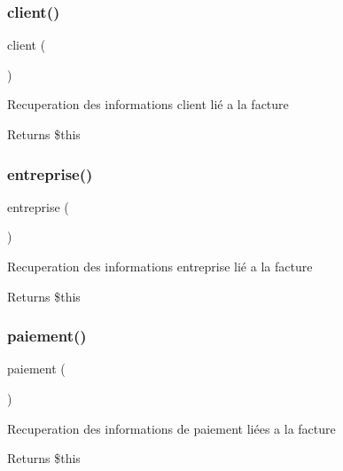 \subsubsection{\texorpdfstring{client()}{client()}}
{\footnotesize\ttfamily client (\begin{DoxyParamCaption}{ }\end{DoxyParamCaption})}

Recuperation des informations client lié a la facture \begin{DoxyReturn}{Returns}
\$this 
\end{DoxyReturn}
\mbox{\label{class_app_1_1_facture_ad51130e7e8195d53e3670bb41642cb14}} 
\subsubsection{\texorpdfstring{entreprise()}{entreprise()}}
{\footnotesize\ttfamily entreprise (\begin{DoxyParamCaption}{ }\end{DoxyParamCaption})}

Recuperation des informations entreprise lié a la facture \begin{DoxyReturn}{Returns}
\$this 
\end{DoxyReturn}
\mbox{\label{class_app_1_1_facture_a66d456cbae7f1c1bb77dd821d23f02b8}} 
\subsubsection{\texorpdfstring{paiement()}{paiement()}}
{\footnotesize\ttfamily paiement (\begin{DoxyParamCaption}{ }\end{DoxyParamCaption})}

Recuperation des informations de paiement liées a la facture \begin{DoxyReturn}{Returns}
\$this 
\end{DoxyReturn}
\mbox{\label{class_app_1_1_facture_a7d57b7b59a41f1e62a9162798054aee1}} 
